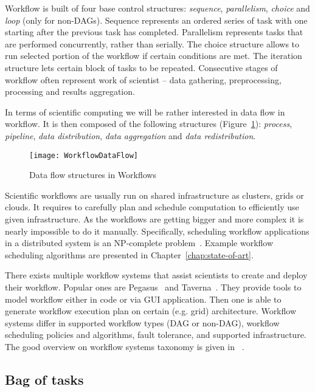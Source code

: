 Workflow is built of four base control structures: \emph{sequence}, \emph{parallelism}, \emph{choice} and \emph{loop} (only for non-DAGs). Sequence represents an ordered series of task with one starting after the previous task has completed. Parallelism represents tasks that are performed concurrently, rather than serially. The choice structure allows to run selected portion of the workflow if certain conditions are met. The iteration structure lets certain block of tasks to be repeated. Consecutive stages of workflow often represent work of scientist – data gathering, preprocessing, processing and results aggregation. 

In terms of scientific computing we will be rather interested in data flow in workflow. It is then composed of the following structures (Figure~\ref{fig:intro:workflow:structures}): \emph{process}, \emph{pipeline}, \emph{data distribution}, \emph{data aggregation} and \emph{data redistribution}.

\begin{figure}[tb]
   \centering
   \texttt{[image: WorkflowDataFlow]}  
   \caption{Data flow structures in Workflows~\cite{Bharathi08}}
   \label{fig:intro:workflow:structures}
\end{figure} 


Scientific workflows are usually run on shared infrastructure as clusters, grids or clouds. It requires to carefully plan and schedule computation to efficiently use given infrastructure. As the workflows are getting bigger and more complex it is nearly impossible to do it manually. Specifically, scheduling workflow applications in a distributed system is an NP-complete problem~\cite{Garey:1979:CIG:578533}. Example workflow scheduling algorithms are presented in Chapter \ref{chap:state-of-art}.

There exists multiple workflow systems that assist scientists to create and deploy their workflow. Popular ones are Pegasus~\cite{Pegasus} and Taverna~\cite{Taverna}. They provide tools to model workflow either in code or via GUI application. Then one is able to generate workflow execution plan on certain (e.g. grid) architecture. Workflow systems differ in supported workflow types (DAG or non-DAG), workflow scheduling policies and algorithms, fault tolerance, and supported infrastructure. The good overview on workflow systems taxonomy is given in ~\cite{Yu:2005:TSW:1084805.1084814}.

\subsection{Bag of tasks}

